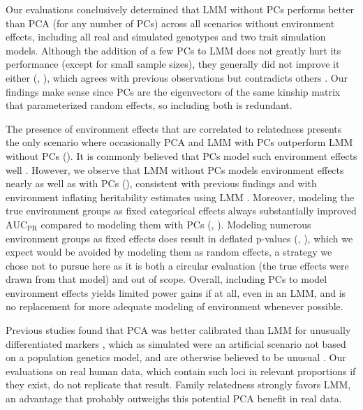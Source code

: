 \documentclass[9pt,lineno]{elife}
\newcommand{\auc}{\text{AUC}_\text{PR}}
\begin{document}
Our evaluations conclusively determined that LMM without PCs performs better than PCA (for any number of PCs) across all scenarios without environment effects, including all real and simulated genotypes and two trait simulation models.
Although the addition of a few PCs to LMM does not greatly hurt its performance (except for small sample sizes), they generally did not improve it either (, ), which agrees with previous observations \citep{liu_controlling_2011, janss_inferences_2012} but contradicts others \citep{zhao_arabidopsis_2007, price_new_2010}.
Our findings make sense since PCs are the eigenvectors of the same kinship matrix that parameterized random effects, so including both is redundant.

The presence of environment effects that are correlated to relatedness presents the only scenario where occasionally PCA and LMM with PCs outperform LMM without PCs ().
It is commonly believed that PCs model such environment effects well \citep{novembre_genes_2008, zhang_principal_2015, lin_admixed_2021}.
However, we observe that LMM without PCs models environment effects nearly as well as with PCs (), consistent with previous findings \citep{vilhjalmsson_nature_2013, wang_trade-offs_2022} and with environment inflating heritability estimates using LMM \citep{heckerman_linear_2016}.
Moreover, modeling the true environment groups as fixed categorical effects always substantially improved $\auc$ compared to modeling them with PCs (, ).
Modeling numerous environment groups as fixed effects does result in deflated p-values (, ), which we expect would be avoided by modeling them as random effects, a strategy we chose not to pursue here as it is both a circular evaluation (the true effects were drawn from that model) and out of scope.
Overall, including PCs to model environment effects yields limited power gains if at all, even in an LMM, and is no replacement for more adequate modeling of environment whenever possible.

Previous studies found that PCA was better calibrated than LMM for unusually differentiated markers \citep{price_new_2010, wu_comparison_2011, yang_advantages_2014}, which as simulated were an artificial scenario not based on a population genetics model, and are otherwise believed to be unusual \citep{sul_mixed_2013, price_response_2013}.
Our evaluations on real human data, which contain such loci in relevant proportions if they exist, do not replicate that result.
Family relatedness strongly favors LMM, an advantage that probably outweighs this potential PCA benefit in real data.
\end{document}
